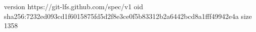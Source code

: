 version https://git-lfs.github.com/spec/v1
oid sha256:7232ed093cd1f6015875fd5d2f8e3ce0f5b83312b2a6442bcd8a1fff49942e4a
size 1358
